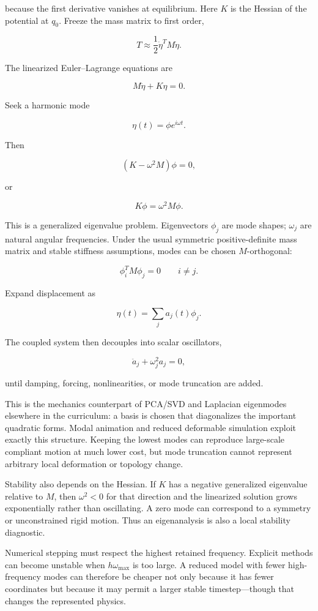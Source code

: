 because the first derivative vanishes at equilibrium. Here \(K\) is the Hessian of the potential at \(q_0\). Freeze the mass matrix to first order,

\[
T
\approx
\frac12\dot\eta^T M\dot\eta.
\]

The linearized Euler--Lagrange equations are

\[
M\ddot\eta+K\eta=0.
\]

Seek a harmonic mode

\[
\eta(t)=\phi e^{i\omega t}.
\]

Then

\[
(K-\omega^2M)\phi=0,
\]

or

\[
\boxed{
K\phi=\omega^2M\phi.
}
\]

This is a generalized eigenvalue problem. Eigenvectors \(\phi_j\) are mode shapes; \(\omega_j\) are natural angular frequencies. Under the usual symmetric positive-definite mass matrix and stable stiffness assumptions, modes can be chosen \(M\)-orthogonal:

\[
\phi_i^T M\phi_j=0
\qquad i\neq j.
\]

Expand displacement as

\[
\eta(t)=\sum_j a_j(t)\phi_j.
\]

The coupled system then decouples into scalar oscillators,

\[
\ddot a_j+\omega_j^2a_j=0,
\]

until damping, forcing, nonlinearities, or mode truncation are added.

This is the mechanics counterpart of PCA/SVD and Laplacian eigenmodes elsewhere in the curriculum: a basis is chosen that diagonalizes the important quadratic forms. Modal animation and reduced deformable simulation exploit exactly this structure. Keeping the lowest modes can reproduce large-scale compliant motion at much lower cost, but mode truncation cannot represent arbitrary local deformation or topology change.

Stability also depends on the Hessian. If \(K\) has a negative generalized eigenvalue relative to \(M\), then \(\omega^2<0\) for that direction and the linearized solution grows exponentially rather than oscillating. A zero mode can correspond to a symmetry or unconstrained rigid motion. Thus an eigenanalysis is also a local stability diagnostic.

Numerical stepping must respect the highest retained frequency. Explicit methods can become unstable when \(h\omega_{\max}\) is too large. A reduced model with fewer high-frequency modes can therefore be cheaper not only because it has fewer coordinates but because it may permit a larger stable timestep---though that changes the represented physics.


